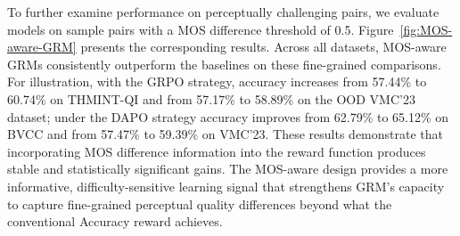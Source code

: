 To further examine performance on perceptually challenging pairs, we evaluate models  on sample pairs with a MOS difference threshold of 0.5.  Figure~\ref{fig:MOS-aware-GRM} presents the corresponding results. Across all datasets, MOS-aware GRMs consistently outperform the baselines on these fine-grained comparisons. For illustration, with the GRPO strategy, accuracy increases from 57.44\% to 60.74\% on THMINT-QI and from 57.17\% to 58.89\% on the OOD VMC'23 dataset; under the DAPO strategy accuracy improves from 62.79\% to 65.12\% on BVCC and from 57.47\% to 59.39\% on VMC'23. 
These results demonstrate that incorporating MOS difference information into the reward function produces stable and statistically significant gains. The MOS-aware design provides a more informative, difficulty-sensitive learning signal that strengthens GRM's capacity to capture fine-grained perceptual quality differences beyond what the conventional Accuracy reward achieves.
